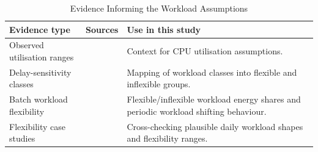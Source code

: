 \documentclass[lettersize,journal]{IEEEtran}
\providecommand{\DIFadd}[1]{{\color{blue}#1}}
\providecommand{\DIFaddFL}[1]{\DIFadd{#1}}
\providecommand{\DIFaddbeginFL}{}
\providecommand{\DIFaddendFL}{}
\begin{document}
\begin{table}[!t]
\centering
\caption{ \DIFaddbeginFL \DIFaddFL{Evidence Informing the }\DIFaddendFL Workload  \DIFaddbeginFL \DIFaddFL{Assumptions}\DIFaddendFL }
 \DIFaddbeginFL \label{tab:workload-source-summary}
\DIFaddendFL \begin{scriptsize}
 
\DIFaddbeginFL \begin{tabular}{p{}p{}p{}}
\toprule
\DIFaddFL{\textbf{Evidence type} }& \DIFaddFL{\textbf{Sources} }& \DIFaddFL{\textbf{Use in this study} }\\
\midrule
\DIFaddFL{Observed utilisation ranges }& \DIFaddFL{\cite{Zaloumis2022IBM,Ghia2011McKinsey} }& \DIFaddFL{Context for CPU utilisation assumptions. }\\
\DIFaddFL{Delay-sensitivity classes }& \DIFaddFL{\cite{6779441} }& \DIFaddFL{Mapping of workload classes into flexible and inflexible groups. }\\
\DIFaddFL{Batch workload flexibility }& \DIFaddFL{\cite{Cao2022ApEn} }& \DIFaddFL{Flexible/inflexible workload energy shares and periodic workload shifting behaviour. }\\
\DIFaddFL{Flexibility case studies }& \DIFaddFL{\cite{Misaghian2023TIA,Xu2023SPIE,Zhou2024IJEPES,Fu2020ApEn,Liu2012PER} }& \DIFaddFL{Cross-checking plausible daily workload shapes and flexibility ranges. }\\
\bottomrule
\end{tabular}
\DIFaddendFL \end{scriptsize}
\end{table}
\end{document}
